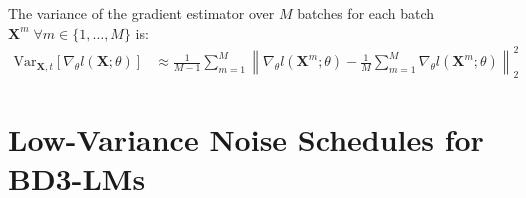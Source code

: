 \documentclass{article} %
\newcommand{\vkl}[1]{\textcolor{blue}{[VK: #1]}}
\def\algos{BD3-LMs}
\begin{document}


The variance of the gradient estimator over $M$ batches for each batch $\mathbf{X}^m \; \forall m \in \{ 1, \dots, M\}$ is:
 \begin{align}\label{eq:grad-var-estimator}
     \text{Var}_{\mathbf{X}, t}\left[
    \nabla_\theta l (\mathbf{X}; \theta) \right] 
&\approx  \frac{1}{M-1} \sum_{m=1}^M \left\lVert 
    \nabla_\theta l (\mathbf{X}^m; \theta) - \frac{1}{M} \sum_{m=1}^M \nabla_\theta l(\mathbf{X}^m; \theta)
\right\rVert^2_2
\end{align}








\section{Low-Variance Noise Schedules for \algos{}}
\end{document}

